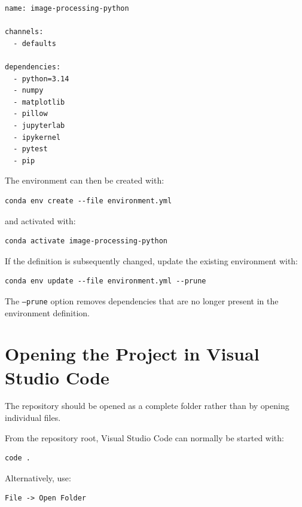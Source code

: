 \begin{listing}[htbp]
    \caption{Initial conda environment definition targeting Python 3.14.}
    \label{lst:environment-yml}

\begin{verbatim}
name: image-processing-python

channels:
  - defaults

dependencies:
  - python=3.14
  - numpy
  - matplotlib
  - pillow
  - jupyterlab
  - ipykernel
  - pytest
  - pip
\end{verbatim}

\end{listing}

The environment can then be created with:

\begin{verbatim}
conda env create --file environment.yml
\end{verbatim}

and activated with:

\begin{verbatim}
conda activate image-processing-python
\end{verbatim}

If the definition is subsequently changed, update the existing
environment with:

\begin{verbatim}
conda env update --file environment.yml --prune
\end{verbatim}

The \texttt{--prune} option removes dependencies that are no longer
present in the environment definition.


\section{Opening the Project in Visual Studio Code}
\label{sec:open-vscode}

The repository should be opened as a complete folder rather than by
opening individual files.

From the repository root, Visual Studio Code can normally be started
with:

\begin{verbatim}
code .
\end{verbatim}

Alternatively, use:

\begin{verbatim}
File -> Open Folder
\end{verbatim}

